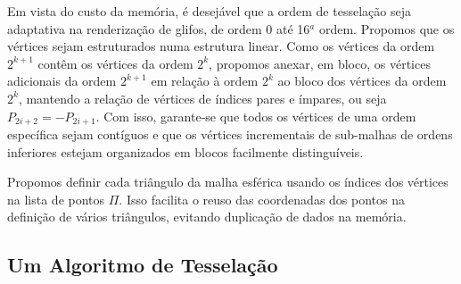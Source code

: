 
Em vista do custo da memória, é desejável que a ordem de tesselação seja adaptativa na renderização de glifos, de ordem 0 até 16$^a$ ordem. Propomos que os vértices sejam estruturados numa estrutura linear. Como os vértices da ordem $2^{k+1}$ contêm os vértices da ordem $2^{k}$, propomos anexar, em bloco, os vértices adicionais da ordem $2^{k+1}$ em relação à ordem $2^k$ ao bloco dos vértices da ordem $2^k$, mantendo a relação de vértices de índices pares e ímpares, ou seja $P_{2i+2} = -P_{2i+1}$. Com isso, garante-se que todos os vértices de uma ordem específica sejam contíguos e que os vértices incrementais de sub-malhas de ordens inferiores estejam organizados em blocos facilmente distinguíveis.


Propomos definir cada triângulo da malha esférica usando os índices dos vértices na lista de pontos $\Pi$. Isso facilita o reuso das coordenadas dos pontos na definição de vários triângulos, evitando duplicação de dados na memória. %

\subsection{Um Algoritmo de Tesselação}
\label{sssec::formulação_da_geometria_e_estruturação_de_dados}

